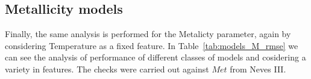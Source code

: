 


\subsection{Metallicity models} 

Finally, the same analysis is performed for the Metalicty parameter, 
again by considering Temperature as a fixed feature.
In Table~\ref{tab:models_M_rmse} 
we can see the analysis of performance of different classes of
models and cosidering a variety in features. The checks were carried out against 
$Met$ from Neves III.

